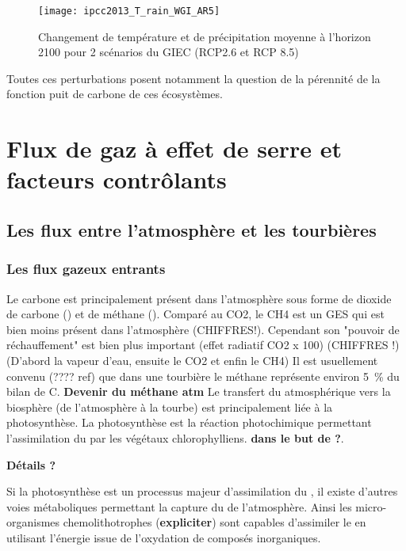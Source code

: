 \begin{figure}
\centering
\texttt{[image: ipcc2013\_T\_rain\_WGI\_AR5]}
\caption{Changement de température et de précipitation moyenne à l'horizon 2100 pour 2 scénarios du GIEC (RCP2.6 et RCP 8.5)}
\label{fig:ipcc2013_T_rain}
\end{figure}

Toutes ces perturbations posent notamment la question de la pérennité de la fonction puit de carbone de ces écosystèmes.


\section{Flux de gaz à effet de serre et facteurs contrôlants}

\subsection{Les flux entre l'atmosphère et les tourbières}

\subsubsection{Les flux gazeux entrants}

Le carbone est principalement présent dans l'atmosphère sous forme de dioxide de carbone (\coo) et de méthane (\chh).
Comparé au CO2, le CH4 est un GES qui est bien moins présent dans l'atmosphère (CHIFFRES!).
Cependant son "pouvoir de réchauffement" est bien plus important (effet radiatif CO2 x 100) (CHIFFRES !) (D'abord la vapeur d'eau, ensuite le CO2 et enfin le CH4)
Il est usuellement convenu (???? ref) que dans une tourbière le méthane représente environ \SI{5}{\percent} du bilan de C.
\textbf{Devenir du méthane atm}
Le transfert du \coo atmosphérique vers la biosphère (de l'atmosphère à la tourbe) est principalement \plop liée à la photosynthèse.
La photosynthèse est la réaction photochimique permettant l'assimilation du \coo par les végétaux chlorophylliens.
\textbf{dans le but de ?}.

\textbf{Détails ?}

Si la photosynthèse est un processus majeur d'assimilation du \coo, il existe d'autres voies métaboliques permettant la capture du \coo de l'atmosphère.
Ainsi les micro-organismes chemolithotrophes (\textbf{expliciter}) sont capables d'assimiler le \coo en utilisant l'énergie issue de l'oxydation de composés inorganiques.

